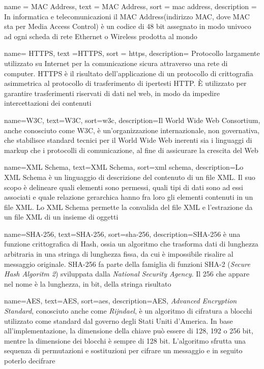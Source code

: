 {
	name = {MAC Address},
	text = {MAC Address},
	sort = {mac address},
	description = {In informatica e telecomunicazioni il MAC Address(indirizzo MAC, dove MAC sta per Media Access Control) è un codice di 48 bit assegnato in modo univoco ad ogni scheda di rete Ethernet o Wireless prodotta al mondo}
}

{
	name= {HTTPS},
	text ={HTTPS},
	sort = {https},
	description= {Protocollo largamente utilizzato su Internet per la comunicazione sicura attraverso una rete di computer. HTTPS è il risultato dell'applicazione di un protocollo di crittografia asimmetrica al protocollo di trasferimento di ipertesti HTTP. È utilizzato per garantire trasferimenti riservati di dati nel web, in modo da impedire intercettazioni dei contenuti}
}

{
	name={W3C},
	text={W3C},
	sort={w3c},
	description={Il World Wide Web Consortium, anche conosciuto come W3C, è un'organizzazione internazionale, non governativa, che stabilisce standard tecnici per il World Wide Web inerenti sia i linguaggi di markup che i protocolli di comunicazione, al fine di assicurare la crescita del Web}
}	

{
	name={XML Schema},
	text={XML Schema},
	sort={xml schema},
	description={Lo XML Schema è un linguaggio di descrizione del contenuto di un file XML. Il suo scopo è delineare quali elementi sono permessi, quali tipi di dati sono ad essi associati e quale relazione gerarchica hanno fra loro gli elementi contenuti in un file XML. Lo XML Schema permette la convalida del file XML e l'estrazione da un file XML di un insieme di oggetti}
}
	
{
	name={SHA-256},
	text={SHA-256},
	sort={sha-256},
	description={SHA-256 è una funzione crittografica di Hash, ossia un algoritmo che trasforma dati di lunghezza arbitraria in una stringa di lunghezza fissa, da cui è impossibile risalire al messaggio originale. SHA-256 fa parte della famiglia di funzioni SHA-2 (\textit{Secure Hash Algoritm 2}) sviluppata dalla \textit{National Security Agency}. Il 256 che appare nel nome è la lunghezza, in bit, della stringa risultato}
}

{
	name={AES},
	text={AES},
	sort={aes},
	description={AES, \textit{Advanced Encryption Standard}, conosciuto anche come \textit{Rijndael}, è un algoritmo di cifratura a blocchi utilizzato come standard dal governo degli Stati Uniti d'America. In base all'implementazione, la dimensione della chiave può essere di 128, 192 o 256 bit, mentre la dimensione dei blocchi è sempre di 128 bit. L'algoritmo sfrutta una sequenza di permutazioni e sostituzioni per cifrare un messaggio e in seguito poterlo decifrare}
}

